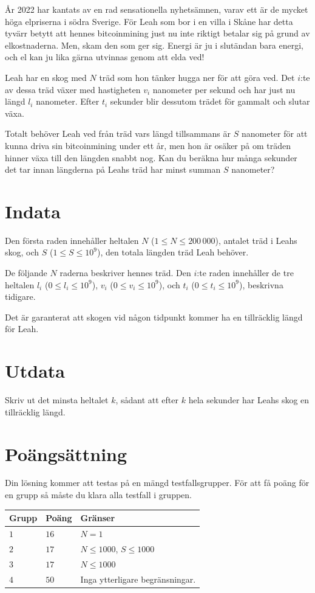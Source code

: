 År 2022 har kantats av en rad sensationella nyhetsämnen, varav ett är de mycket höga elpriserna i södra Sverige.
För Leah som bor i en villa i Skåne har detta tyvärr betytt att hennes bitcoinmining just nu inte riktigt betalar sig på grund av elkostnaderna.
Men, skam den som ger sig.
Energi är ju i slutändan bara energi, och el kan ju lika gärna utvinnas genom att elda ved!

Leah har en skog med $N$ träd som hon tänker hugga ner för att göra ved.
Det $i$:te av dessa träd växer med hastigheten $v_i$ nanometer per sekund och har just nu längd $l_i$ nanometer.
Efter $t_i$ sekunder blir dessutom trädet för gammalt och slutar växa.

Totalt behöver Leah ved från träd vars längd tillsammans är $S$ nanometer för att kunna driva sin bitcoinmining under ett år, men hon är osäker på om träden hinner växa till den längden snabbt nog.
Kan du beräkna hur många sekunder det tar innan längderna på Leahs träd har minst summan $S$ nanometer?

\section*{Indata}
Den första raden innehåller heltalen $N$ ($1 \le N \le 200\,000$), antalet träd i Leahs skog, och $S$ ($1 \le S \le 10^9$), den totala längden träd Leah behöver.

De följande $N$ raderna beskriver hennes träd.
Den $i$:te raden innehåller de tre heltalen $l_i$ ($0 \le l_i \le 10^9$), $v_i$ ($0 \le v_i \le 10^9$), och $t_i$ ($0 \le t_i \le 10^9$), beskrivna tidigare.

Det är garanterat att skogen vid någon tidpunkt kommer ha en tillräcklig längd för Leah.

\section*{Utdata}
Skriv ut det minsta heltalet $k$, sådant att efter $k$ hela sekunder har Leahs skog en tillräcklig längd.

\section*{Poängsättning}
Din lösning kommer att testas på en mängd testfallsgrupper.
För att få poäng för en grupp så måste du klara alla testfall i gruppen.

\noindent
\begin{tabular}{| l | l | p{12cm} |}
  \hline
  \textbf{Grupp} & \textbf{Poäng} & \textbf{Gränser} \\ \hline
  $1$    & $16$      & $N = 1$ \\ \hline
  $2$    & $17$      & $N \le 1000$, $S \le 1000$ \\ \hline
  $3$    & $17$      & $N \le 1000$ \\ \hline
  $4$    & $50$      & Inga ytterligare begränsningar. \\ \hline
\end{tabular}

